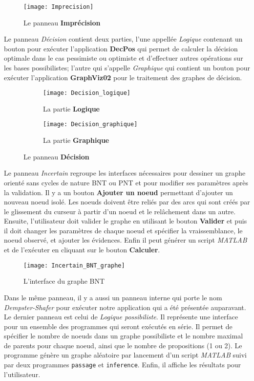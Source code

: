 \begin{figure}[H]
\centering
\texttt{[image: Imprecision]}
\caption{Le panneau \textbf{Imprécision}}
\end{figure}

Le panneau \textit{Décision} contient deux parties, l'une appellée \textit{Logique}
contenant un bouton pour exécuter l'application \textbf{DecPos} qui permet de calculer la décision optimale dans
le cas pessimiste ou optimiste et d'effectuer autres opérations sur les bases possibilistes; l'autre qui
s'appelle \textit{Graphique} qui contient un bouton pour exécuter l'application \textbf{GraphViz02} pour
le traitement des graphes de décision.

\begin{figure}[H]
\begin{subfigure}{0.49\textwidth}
\texttt{[image: Decision\_logique]}
\caption{La partie \textbf{Logique}}
\end{subfigure}
\hfill
\begin{subfigure}{0.49\textwidth}
\texttt{[image: Decision\_graphique]}
\caption{La partie \textbf{Graphique}}
\end{subfigure}
\caption{Le panneau \textbf{Décision}}
\end{figure}

\vspace*{1.5em}
Le panneau \textit{Incertain} regroupe les interfaces nécessaires pour dessiner un graphe orienté sans
cycles de nature BNT ou PNT et pour modifier ses paramètres après la validation. Il y a un bouton \textbf{Ajouter un noeud}
permettant d'ajouter un nouveau noeud isolé. Les noeuds doivent être reliés par des arcs qui sont créés par le
glissement du curseur à partir d'un noeud et le relâchement dans un autre. Ensuite, l'utilisateur doit valider le graphe
en utilisant le bouton \textbf{Valider} et puis il doit changer les paramètres de chaque noeud et spécifier la vraissemblance,
le noeud observé, et ajouter les évidences. Enfin il peut générer un script \textit{MATLAB} et de l'exécuter en cliquant
sur le bouton \textbf{Calculer}.
\vspace*{3em}

\begin{figure}[H]
\centering
\texttt{[image: Incertain\_BNT\_graphe]}
\caption{L'interface du graphe BNT}
\end{figure}
\vspace*{2em}

Dans le même panneau, il y a aussi un panneau interne qui porte le nom \textit{Dempster-Shafer} pour exécuter
notre application \appname qui a été présentée auparavant. Le dernier panneau est celui de \textit{Logique possibiliste}.
Il représente une interface pour un ensemble des programmes qui seront exécutés en série. Il permet de spécifier le nombre
de noeuds dans un graphe possibiliste et le nombre maximal de parents pour chaque noeud, ainsi que le nombre de propositions
(1 ou 2). Le programme génère un graphe aléatoire par lancement d'un script \textit{MATLAB} suivi par deux programmes
\texttt{passage} et \texttt{inference}. Enfin, il affiche les résultats pour l'utilisateur.

